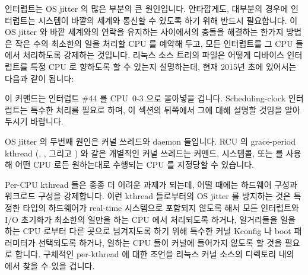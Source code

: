 인터럽트는 OS jitter 의 많은 부분의 큰 원인입니다.
안타깝게도, 대부분의 경우에 인터럽트는 시스템이 바깥의 세계와 통신할 수 있도록
하기 위해 반드시 필요합니다.
이 OS jitter 와 바깥 세계와의 연락을 유지하는 사이에서의 충돌을 해결하는 한가지
방법은 작은 수의 최소한의 일을 처리할 CPU 를 예약해 두고, 모든 인터럽트를 그
CPU 들에서 처리하도록 강제하는 것입니다.
리눅스 소스 트리의  파일은 어떻게 디바이스
인터럽트를 특정 CPU 로 향하도록 할 수 있는지 설명하는데, 현재 2015년 초에
있어서는 다음과 같이 됩니다:

\begin{quote}
	\scriptsize
\end{quote}

이 커맨드는 인터럽트 \#44 를 CPU~0-3 으로 몰아넣을 겁니다.
Scheduling-clock 인터럽트는 특수한 처리를 필요로 하며, 이 섹션의 뒤쪽에서 그에
대해 설명할 것임을 알아두시기 바랍니다.

OS jitter 의 두번째 원인은 커널 쓰레드와 daemon 들입니다.
RCU 의 grace-period kthread (, , 그리고
) 와 같은 개별적인 커널 쓰레드는  커맨드,
 시스템콜, 또는  를 사용해 어떤 CPU 로든
원하는대로 수행되는 CPU 를 지정당할 수 있습니다.

Per-CPU kthread 들은 종종 더 어려운 과제가 되는데, 어떨 때에는 하드웨어 구성과
워크로드 구성을 강제합니다.
이런 kthread 들로부터의 OS jitter 를 방지하는 것은 특정한 타입의 하드웨어가
real-time 시스템으로 포함되지 않도록 해서 모든 인터럽트와 I/O 초기화가 최소한의
일만을 하는 CPU 에서 처리되도록 하거나, 일거리들을 일을 하는 CPU 로부터 다른
곳으로 넘겨지도록 하기 위해 특수한 커널 Kconfig 나 boot 패러미터가 선택되도록
하거나, 일하는 CPU 들이 커널에 들어가지 않도록 할 것을 필요로 합니다.
구체적인 per-kthread 에 대한 조언을 리눅스 커널 소스의 
디렉토리 내의  에서 찾을 수 있을 겁니다.
\iffalse


